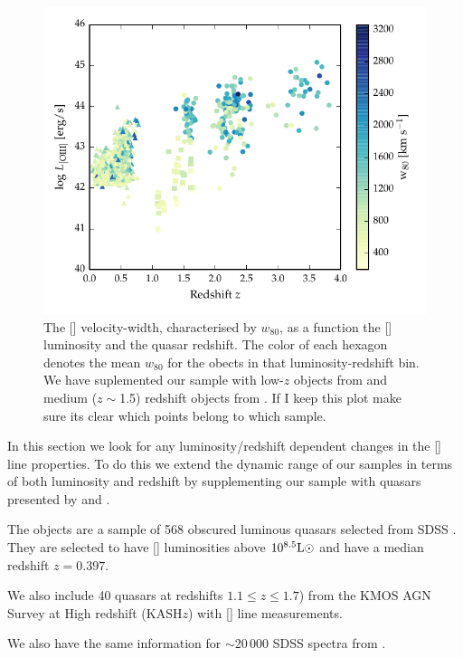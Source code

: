 \begin{figure}
    \includegraphics[width=\columnwidth]{figures/chapter04/oiii_luminosity_z_w80.pdf} 
    \caption{The [] velocity-width, characterised by $w_{80}$, as a function the [] luminosity and the quasar redshift. The color of each hexagon denotes the mean $w_{80}$ for the obects in that luminosity-redshift bin. We have suplemented our sample with low-$z$ objects from \citet{zakamska14} and medium ($z\sim$1.5) redshift objects from \citet{harrison16}. If I keep this plot make sure its clear which points belong to which sample.}       
    \label{fig:oiii_luminosity_z_w80}
\end{figure}

In this section we look for any luminosity/redshift dependent changes in the [] line properties. 
To do this we extend the dynamic range of our samples in terms of both luminosity and redshift by supplementing our sample with quasars presented by \citet{zakamska14} and \citet{harrison16}. 

The \citet{zakamska14} objects are a sample of 568 obscured luminous quasars selected from SDSS \citep{reyes08,yuan16}. 
They are selected to have [] luminosities above $10^{8.5}{\rm L}\odot$ and have a median redshift $z=0.397$. 

We also include 40 quasars at redshifts $1.1 \leq z \leq 1.7$) from the KMOS \ac{AGN} Survey at High redshift (KASH$z$) with [] line measurements. 

We also have the same information for $\sim$20\,000 SDSS spectra from \citet{mullaney13}. 

